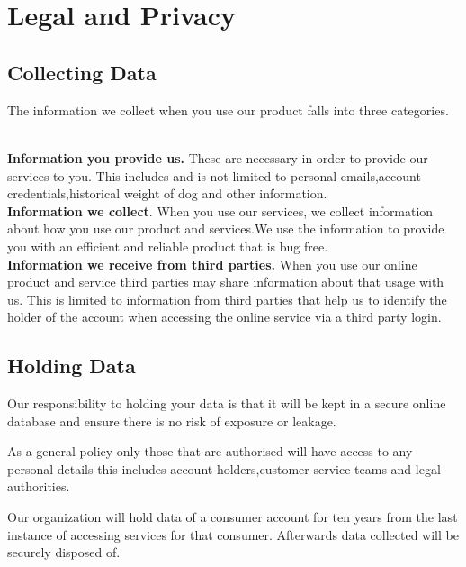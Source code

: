 \\
\\

\section{Legal and Privacy}


\subsection{Collecting Data}
The information we collect when you use our product falls into three categories. 

\\
\textbf{Information you provide us.}
These are necessary in order to provide our services to you. This includes and is not limited to personal emails,account credentials,historical weight of dog and other information.
\\
\textbf{Information we collect}.
When you use our services, we collect information about how you use our product and services.We use the information to provide you with an efficient and reliable product that is bug free.
\\
\textbf{Information we receive from third parties.}
When you use our online product and service third parties may share information about that usage with us. This is limited to information from third parties that help us to identify the holder of the account when accessing the online service via a third party login.

\subsection{Holding Data}
Our responsibility to holding your data is that it will be kept in a secure online database and ensure there is no risk of exposure or leakage. 

As a general policy only those that are authorised will have access to any personal details this includes account holders,customer service teams and legal authorities.

Our organization will hold data of a consumer account for ten years from the last instance of accessing services for that consumer. Afterwards data collected will be securely disposed of.

